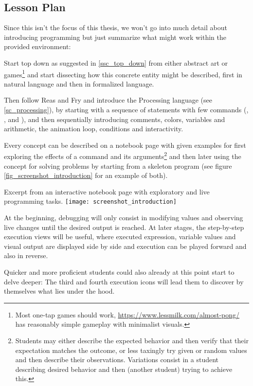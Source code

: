 \subsection{Lesson Plan}

Since this isn't the focus of this thesis, we won't go into much detail about introducing programming but just summarize what might work within the provided environment:

Start top down as suggested in \ref{ssc_top_down} from either abstract art or games\footnote{Most one-tap games should work, \eg \url{https://www.lessmilk.com/almost-pong/} has reasonably simple gameplay with minimalist visuals.} and start dissecting how this concrete entity might be described, first in natural language and then in formalized language.

Then follow Reas and Fry \cite{Rea14} and introduce the Processing language (see \ref{sc_processing}), by starting with a sequence of statements with few commands (\eg {}, ,  and ), and then sequentially introducing comments, colors, variables and arithmetic, the animation loop, conditions and interactivity.

Every concept can be described on a notebook page with given examples for first exploring the effects of a command and its arguments\footnote{Students may either describe the expected behavior and then verify that their expectation matches the outcome, or less taxingly try given or random values and then describe their observations. Variations consist \eg in a student describing desired behavior and then (another student) trying to achieve this.} and then later using the concept for solving problems by starting from a skeleton program (see figure \ref{fig_screenshot_introduction} for an example of both).

\begin{cfigure}{Excerpt from an interactive notebook page with exploratory and live programming tasks.}
\texttt{[image: screenshot\_introduction]}
\end{cfigure}

At the beginning, debugging will only consist in modifying values and observing live changes until the desired output is reached. At later stages, the step-by-step execution views will be useful, where executed expression, variable values and visual output are displayed side by side and execution can be played forward and also in reverse.

Quicker and more proficient students could also already at this point start to delve deeper: The third and fourth execution icons will lead them to discover by themselves what lies under the hood.

